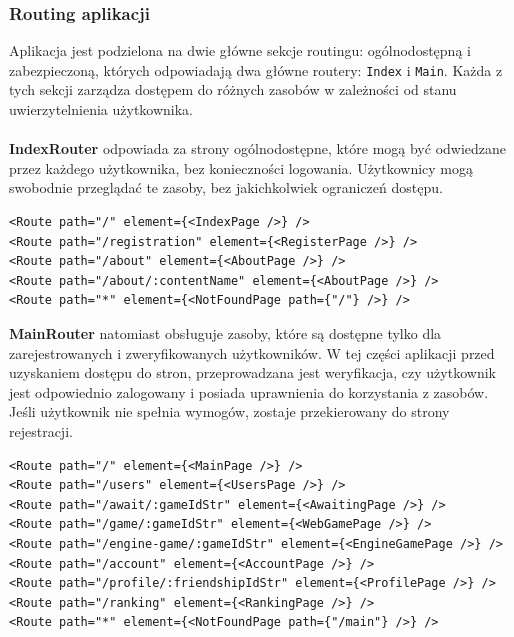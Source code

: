 \documentclass[twoside]{projektInzynierskiMS1}
\begin{document}
\newpage

\subsubsection{Routing aplikacji}

\noindent
Aplikacja jest podzielona na dwie główne sekcje routingu: ogólnodostępną i zabezpieczoną, których odpowiadają dwa główne routery: \texttt{Index} i \texttt{Main}. Każda z tych sekcji zarządza dostępem do różnych zasobów w zależności od stanu uwierzytelnienia użytkownika.
\\\\
\noindent
\textbf{IndexRouter} odpowiada za strony ogólnodostępne, które mogą być odwiedzane przez każdego użytkownika, bez konieczności logowania. Użytkownicy mogą swobodnie przeglądać te zasoby, bez jakichkolwiek ograniczeń dostępu.

\vspace{0.5cm}
\begin{lstlisting}[language=JSX]
<Route path="/" element={<IndexPage />} />
<Route path="/registration" element={<RegisterPage />} />
<Route path="/about" element={<AboutPage />} />
<Route path="/about/:contentName" element={<AboutPage />} />
<Route path="*" element={<NotFoundPage path={"/"} />} />
\end{lstlisting}
\vspace{0.5cm}

\noindent
\textbf{MainRouter} natomiast obsługuje zasoby, które są dostępne tylko dla zarejestrowanych i zweryfikowanych użytkowników. W tej części aplikacji przed uzyskaniem dostępu do stron, przeprowadzana jest weryfikacja, czy użytkownik jest odpowiednio zalogowany i posiada uprawnienia do korzystania z zasobów. Jeśli użytkownik nie spełnia wymogów, zostaje przekierowany do strony rejestracji.

\vspace{0.5cm}
\begin{lstlisting}[language=JSX]
<Route path="/" element={<MainPage />} />
<Route path="/users" element={<UsersPage />} />
<Route path="/await/:gameIdStr" element={<AwaitingPage />} />
<Route path="/game/:gameIdStr" element={<WebGamePage />} />
<Route path="/engine-game/:gameIdStr" element={<EngineGamePage />} />
<Route path="/account" element={<AccountPage />} />
<Route path="/profile/:friendshipIdStr" element={<ProfilePage />} />
<Route path="/ranking" element={<RankingPage />} />
<Route path="*" element={<NotFoundPage path={"/main"} />} />
\end{lstlisting}
\end{document}
